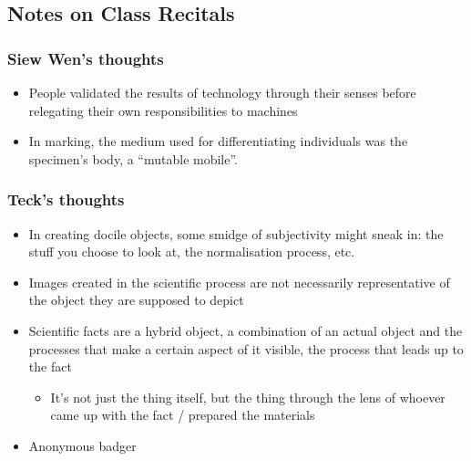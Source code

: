 \documentclass[a4paper]{article}
\begin{document}
\subsection{Notes on Class Recitals}
\subsubsection{Siew Wen's thoughts}
\begin{itemize}
	\item People validated the results of technology through their senses before relegating their own responsibilities to machines 
	\item In marking, the medium used for differentiating individuals was the specimen’s body, a “mutable mobile”.  
\end{itemize}

\subsubsection{Teck's thoughts}
\begin{itemize}
	\item In creating docile objects, some smidge of subjectivity might sneak in: the stuff you choose to look at, the normalisation process, etc.
	\item Images created in the scientific process are not necessarily representative of the object they are supposed to depict
	\item Scientific facts are a hybrid object, a combination of an actual object and the processes that make a certain aspect of it visible, the process that leads up to the fact
	\begin{itemize}[label=$\circ$]
		\item It’s not just the thing itself, but the thing through the lens of whoever came up with the fact / prepared the materials
	\end{itemize}
	\item Anonymous badger
\end{itemize}
\end{document}
